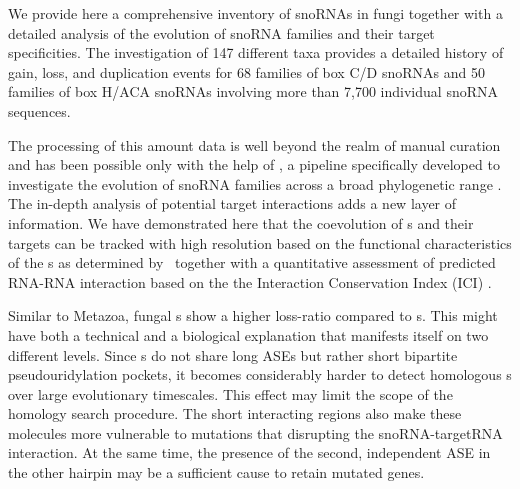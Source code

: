 
We provide here a comprehensive inventory of snoRNAs in fungi together with
a detailed analysis of the evolution of snoRNA families and their target
specificities. The investigation of 147 different taxa provides a detailed
history of gain, loss, and duplication events for 68 families of box C/D
snoRNAs and 50 families of box H/ACA snoRNAs involving more than 7,700
individual snoRNA sequences. 


The processing of this amount data is well beyond the realm of manual
curation and has been possible only with the help of \snostrip, a pipeline
specifically developed to investigate the evolution of snoRNA families
across a broad phylogenetic range \cite{Bartschat:2014}.  The in-depth
analysis of potential target interactions adds a new layer of
information. We have demonstrated here that the coevolution of \sno s and
their targets can be tracked with high resolution based on the functional
characteristics of the \sno s as determined by \snostrip\ together with a
quantitative assessment of predicted RNA-RNA interaction based on the the
Interaction Conservation Index (ICI) \cite{Kehr:2014}.

Similar to Metazoa, fungal \haca s show a higher loss-ratio compared
to \cd s. This might have both a technical and a biological
explanation that manifests itself on two different levels. Since \haca
s do not share long ASEs but rather short bipartite pseudouridylation
pockets, it becomes considerably harder to detect homologous \sno s
over large evolutionary timescales. This effect may limit the
scope of the homology search procedure. The short interacting regions
also make these molecules more vulnerable to mutations that disrupting
the snoRNA-targetRNA interaction. At the same time, the presence of
the second, independent ASE in the other hairpin may be a sufficient
cause to retain mutated genes.

